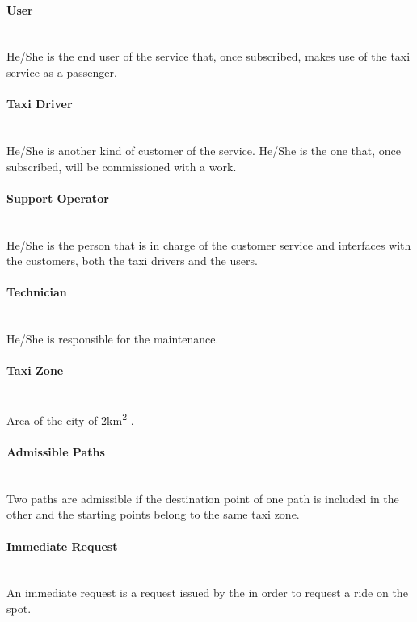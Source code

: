 \paragraph{User} \hfill \\
\label{def:user} He/She is the end user of the service that, once subscribed, makes use of the taxi service as a passenger.

\paragraph{Taxi Driver} \hfill \\
\label{def:taxidriver} He/She is another kind of customer of the service. He/She is the one that, once subscribed, will be commissioned with a work.

\paragraph{Support Operator} \hfill \\
\label{def:operator} He/She is the person that is in charge of the customer service and interfaces with the customers, both the taxi drivers and the users.

\paragraph{Technician} \hfill \\
\label{def:technician} He/She is responsible for the maintenance.

\paragraph{Taxi Zone} \hfill \\
\label{def:taxi_zone} Area of the city of 2km\textsuperscript{2} .

\paragraph{Admissible Paths} \hfill \\
\label{def:admissible} Two paths are admissible if the destination point of one path is included in the other and the starting points belong to the same taxi zone.

\paragraph{Immediate Request} \hfill \\
\label{def:immediate-request} An immediate request is a request issued by the  in order to request a ride on the spot.

